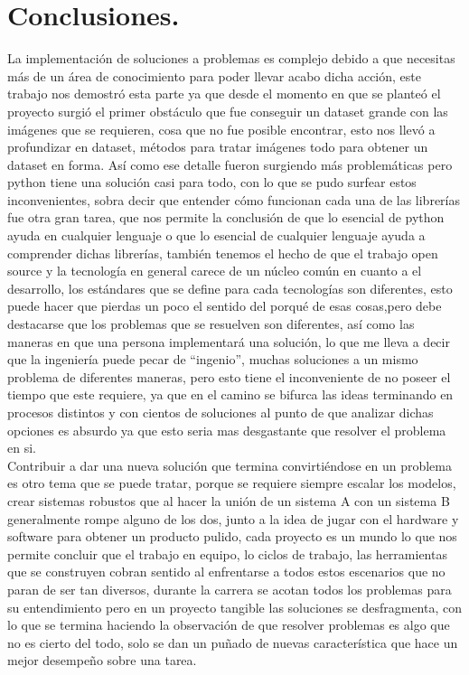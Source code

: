 \documentclass[a4paper, 12pt]{article}
\begin{document}
    \section{Conclusiones.}
    La implementación de soluciones a problemas es complejo debido a que necesitas más de un área de conocimiento para poder llevar acabo dicha acción, este trabajo nos demostró esta parte ya que desde el momento en que se planteó el proyecto surgió el primer obstáculo que fue conseguir un dataset grande con las imágenes que se requieren, cosa que no fue posible encontrar, esto nos llevó a profundizar en dataset, métodos para tratar imágenes todo para obtener un  dataset en forma. Así como ese detalle fueron surgiendo más problemáticas pero python tiene una solución casi para todo, con lo que se pudo surfear estos inconvenientes, sobra decir que entender cómo funcionan cada una de las librerías fue otra gran tarea, que nos permite la conclusión de que lo esencial de python ayuda en cualquier lenguaje o que lo esencial de cualquier lenguaje ayuda a comprender dichas librerías, también tenemos el hecho de que el trabajo open source y la tecnología en general carece de un núcleo común en cuanto a el desarrollo, los estándares que se define para cada tecnologías son diferentes, esto puede hacer que pierdas un poco el sentido del porqué de esas cosas,pero debe destacarse que los problemas que se resuelven son diferentes, así como las maneras en que una persona implementará una solución, lo que me lleva a decir que la ingeniería puede pecar de “ingenio”, muchas soluciones a un mismo problema de diferentes maneras, pero esto tiene el inconveniente de no poseer el tiempo que este requiere, ya que en el camino se bifurca las ideas terminando en procesos distintos y con cientos de soluciones al punto de que analizar dichas opciones es absurdo ya que esto seria mas desgastante que resolver el problema en si.\\
    Contribuir a dar una nueva solución que termina convirtiéndose en un problema es otro tema que se puede tratar, porque se requiere siempre escalar los modelos, crear sistemas robustos que al hacer la unión de un sistema A con un sistema B generalmente rompe alguno de los dos, junto a la idea de jugar con el hardware y software para obtener un producto pulido, cada proyecto es un mundo lo que nos permite concluir que el trabajo en equipo, lo ciclos de trabajo, las herramientas que se construyen cobran sentido al enfrentarse a todos estos escenarios que no paran de ser tan diversos, durante la carrera se acotan todos los problemas para su entendimiento pero en  un proyecto tangible las soluciones se desfragmenta, con lo que se termina haciendo la observación de que resolver problemas es algo que no es cierto del todo, solo se dan un puñado de nuevas característica que hace un mejor desempeño sobre una tarea. 

    \printbibliography
\end{document}

